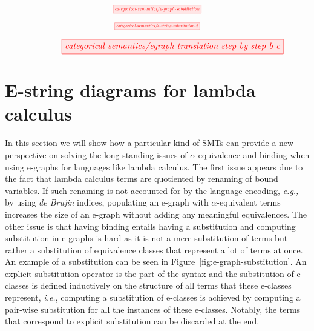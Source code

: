 \documentclass[sigconf, 9pt, nonacm]{acmart}
\theoremstyle{definition}
\begin{document}
\begin{figure*}
    \[
        \scalebox{0.55}{
        \tikzfig{categorical-semantics/e-graph-substitution}
        }
    \]
    \caption{E-graph explicit substitution example.}
    \label{fig:e-graph-substitution}
\end{figure*}

\begin{figure*}
    \[
        \scalebox{0.5}{
        \tikzfig{categorical-semantics/e-string-substitution-2}
        }
    \]
    \caption{E-string diagrammatic substitution example.}
    \label{fig:e-string-substitution}
\end{figure*}

\begin{figure*}[t!]
    \vspace{-3cm}
    \centering
    \[
        \hspace{1.3cm}
        \resizebox{0.8\textwidth}{!}{
        \tikzfig{categorical-semantics/egraph-translation-step-by-step-b-c}
        }
    \]
    \caption{Example translation from $(b)$ to $(c)$.}
    \label{fig:e-graph-example-b-c}
\end{figure*}

\section{E-string diagrams for lambda calculus}
In this section we will show how a particular kind of SMTs can provide a new perspective on solving the long-standing issues of $\alpha$-equivalence and binding when using e-graphs for languages like lambda calculus.
The first issue appears due to the fact that lambda calculus terms are quotiented by renaming of bound variables.
If such renaming is not accounted for by the language encoding, \textit{e.g.,} by using \textit{de Brujin} indices, populating an e-graph with $\alpha$-equivalent terms increases the size of an e-graph without adding any meaningful equivalences.
The other issue is that having binding entails having a substitution and computing substitution in e-graphs is hard as it is not a mere substitution of terms but rather a substitution of equivalence classes that represent a lot of terms at once.
An example of a substitution can be seen in Figure~\ref{fig:e-graph-substitution}. An explicit substitution operator is the part of the syntax and the substitution of e-classes is defined inductively on the structure of all terms that these e-classes represent, \textit{i.e.}, computing a substitution of e-classes is achieved by computing a pair-wise substitution for all the instances of these e-classes.
Notably, the terms that correspond to explicit substitution can be discarded at the end.
\end{document}
